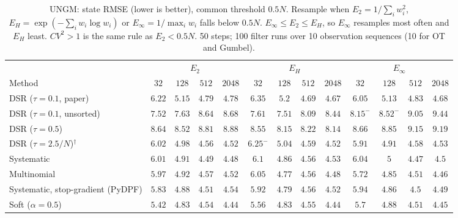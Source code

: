 \begin{table}[ht]
\centering
\small
\caption{UNGM: state RMSE (lower is better), common threshold $0.5N$. Resample when $E_2=1/\sum_iw_i^2$, $E_H=\exp(-\sum_iw_i\log w_i)$ or $E_\infty=1/\max_iw_i$ falls below $0.5N$. $E_\infty\le E_2\le E_H$, so $E_\infty$ resamples most often and $E_H$ least. $CV^2>1$ is the same rule as $E_2<0.5N$. 50 steps; 100 filter runs over 10 observation sequences (10 for OT and Gumbel).}
\label{tab:trigger-fixed-ungm-rmse}
\begin{adjustbox}{max width=\linewidth}
\begin{tabular}{lcccc|cccc|cccc}
\toprule
 & \multicolumn{4}{c}{$E_2$} & \multicolumn{4}{c}{$E_H$} & \multicolumn{4}{c}{$E_\infty$} \\
\cmidrule(lr){2-5} \cmidrule(lr){6-9} \cmidrule(lr){10-13}
Method & $32$ & $128$ & $512$ & $2048$ & $32$ & $128$ & $512$ & $2048$ & $32$ & $128$ & $512$ & $2048$ \\
\midrule
DSR ($\tau{=}0.1$, paper) & $6.22$ & $5.15$ & $4.79$ & $4.78$ & $6.35$ & $5.2$ & $\mathbf{4.69}$ & $\mathbf{4.67}$ & $\mathbf{6.05}$ & $\mathbf{5.13}$ & $4.83$ & $4.68$ \\
DSR ($\tau{=}0.1$, unsorted) & $\mathbf{7.52}$ & $7.63$ & $8.64$ & $8.68$ & $7.61$ & $\mathbf{7.51}$ & $\mathbf{8.09}$ & $\mathbf{8.44}$ & $8.15^{-}$ & $8.52^{-}$ & $9.05$ & $9.44$ \\
DSR ($\tau{=}0.5$) & $8.64$ & $8.52$ & $8.81$ & $8.88$ & $\mathbf{8.55}$ & $\mathbf{8.15}$ & $\mathbf{8.22}$ & $\mathbf{8.14}$ & $8.66$ & $8.85$ & $9.15$ & $9.19$ \\
DSR ($\tau{=}2.5/N$)$^\dagger$ & $6.02$ & $4.98$ & $\mathbf{4.56}$ & $\mathbf{4.52}$ & $6.25^{-}$ & $5.04$ & $4.59$ & $4.52$ & $\mathbf{5.91}$ & $\mathbf{4.91}$ & $4.58$ & $4.53$ \\
\midrule
Systematic & $\mathbf{6.01}$ & $4.91$ & $4.49$ & $\mathbf{4.48}$ & $6.1$ & $\mathbf{4.86}$ & $4.56$ & $4.53$ & $6.04$ & $5$ & $\mathbf{4.47}$ & $4.5$ \\
Multinomial & $5.97$ & $4.92$ & $4.57$ & $4.52$ & $6.05$ & $\mathbf{4.77}$ & $4.56$ & $4.48$ & $\mathbf{5.72}$ & $4.85$ & $\mathbf{4.51}$ & $\mathbf{4.46}$ \\
Systematic, stop-gradient (PyDPF) & $\mathbf{5.83}$ & $4.88$ & $4.51$ & $4.54$ & $5.92$ & $\mathbf{4.79}$ & $4.56$ & $4.52$ & $5.94$ & $4.86$ & $\mathbf{4.5}$ & $\mathbf{4.49}$ \\
Soft ($\alpha{=}0.5$) & $\mathbf{5.42}$ & $\mathbf{4.83}$ & $4.54$ & $4.44$ & $5.56$ & $4.83$ & $4.55$ & $\mathbf{4.44}$ & $5.7$ & $4.88$ & $\mathbf{4.51}$ & $4.45$ \\

\end{tabular}
\end{adjustbox}
\end{table}
